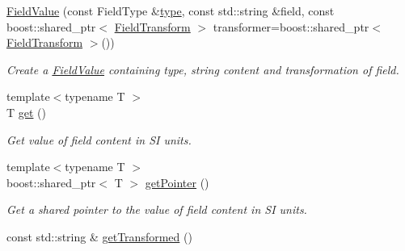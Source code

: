 \begin{DoxyCompactItemize}
\item 
\hyperlink{classtudat_1_1input__output_1_1FieldValue_ad8b2de31cda471fc3620ddd731bbc932}{Field\+Value} (const Field\+Type \&\hyperlink{classtudat_1_1input__output_1_1FieldValue_aef971559bdcdf9d08782073882e161a0}{type}, const std\+::string \&field, const boost\+::shared\+\_\+ptr$<$ \hyperlink{classtudat_1_1input__output_1_1FieldTransform}{Field\+Transform} $>$ transformer=boost\+::shared\+\_\+ptr$<$ \hyperlink{classtudat_1_1input__output_1_1FieldTransform}{Field\+Transform} $>$())
\begin{DoxyCompactList}\small\item\em Create a \hyperlink{classtudat_1_1input__output_1_1FieldValue}{Field\+Value} containing type, string content and transformation of field. \end{DoxyCompactList}\item 
{\footnotesize template$<$typename T $>$ }\\T \hyperlink{classtudat_1_1input__output_1_1FieldValue_a2b0c0ef1510cfe80cf5bd2644c802921}{get} ()\hypertarget{classtudat_1_1input__output_1_1FieldValue_a2b0c0ef1510cfe80cf5bd2644c802921}{}\label{classtudat_1_1input__output_1_1FieldValue_a2b0c0ef1510cfe80cf5bd2644c802921}

\begin{DoxyCompactList}\small\item\em Get value of field content in SI units. \end{DoxyCompactList}\item 
{\footnotesize template$<$typename T $>$ }\\boost\+::shared\+\_\+ptr$<$ T $>$ \hyperlink{classtudat_1_1input__output_1_1FieldValue_a1b67d53aac822f0511cecb36ada7f7a1}{get\+Pointer} ()\hypertarget{classtudat_1_1input__output_1_1FieldValue_a1b67d53aac822f0511cecb36ada7f7a1}{}\label{classtudat_1_1input__output_1_1FieldValue_a1b67d53aac822f0511cecb36ada7f7a1}

\begin{DoxyCompactList}\small\item\em Get a shared pointer to the value of field content in SI units. \end{DoxyCompactList}\item 
const std\+::string \& \hyperlink{classtudat_1_1input__output_1_1FieldValue_a3df0ef770d9892455684c493c1f2afe6}{get\+Transformed} ()\hypertarget{classtudat_1_1input__output_1_1FieldValue_a3df0ef770d9892455684c493c1f2afe6}{}\label{classtudat_1_1input__output_1_1FieldValue_a3df0ef770d9892455684c493c1f2afe6}


\end{DoxyCompactItemize}
